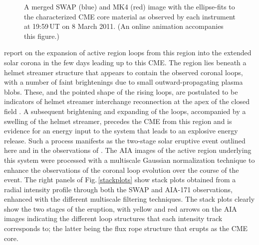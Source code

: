 \documentclass[namedreferences]{solarphysics}
\begin{document}
\begin{article}
\begin{figure}[t]
\caption{A merged SWAP (blue) and MK4 (red) image with the ellipse-fits to the characterized CME core material as observed by each instrument at 19:59\,UT on 8 March 2011. (An online animation accompanies this figure.)}
\label{combined}
\end{figure}

 report on the expansion of active region loops from this region into the extended solar corona in the few days leading up to this CME. The region lies beneath a helmet streamer structure that appears to contain the observed coronal loops, with a number of faint brightenings due to small outward-propagating plasma blobs. These, and the pointed shape of the rising loops, are postulated to be indicators of helmet streamer interchange reconnection at the apex of the closed field \cite{2012ApJ...749..182W}. A subsequent brightening and expanding of the loops, accompanied by a swelling of the helmet streamer, precedes the CME from this region and is evidence for an energy input to the system that leads to an explosive energy release. Such a process manifests as the two-stage solar eruptive event outlined here and in the observations of . The AIA images of the active region underlying this system were processed with a multiscale Gaussian normalization technique \cite{MorganDruckmuller_inreview} to enhance the observations of the coronal loop evolution over the course of the event. The right panels of Fig.\,\ref{stackplots} show stack plots obtained from a radial intensity profile through both the SWAP and AIA-171 observations, enhanced with the different multiscale filtering techniques. The stack plots clearly show the two stages of the eruption, with yellow and red arrows on the AIA images indicating the different loop structures that each intensity track corresponds to; the latter being the flux rope structure that erupts as the CME core.


\end{article}
\end{document}
